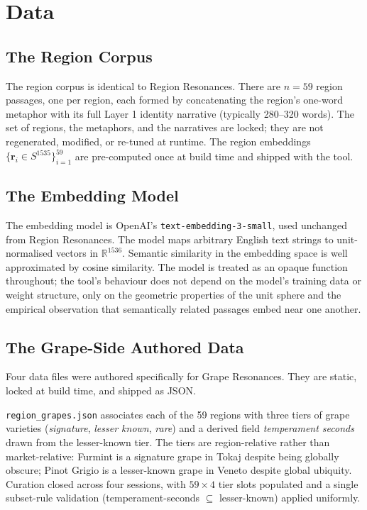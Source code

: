 \documentclass[11pt]{article}
\providecommand{\R}{\mathbb{R}}
\begin{document}
\section{Data}

\subsection{The Region Corpus}
The region corpus is identical to Region Resonances. There are $n = 59$ region passages, one per region, each formed by concatenating the region's one-word metaphor with its full Layer 1 identity narrative (typically 280--320 words). The set of regions, the metaphors, and the narratives are locked; they are not regenerated, modified, or re-tuned at runtime. The region embeddings $\{ \mathbf{r}_i \in S^{1535} \}_{i=1}^{59}$ are pre-computed once at build time and shipped with the tool.

\subsection{The Embedding Model}
The embedding model is OpenAI's \texttt{text-embedding-3-small}, used unchanged from Region Resonances. The model maps arbitrary English text strings to unit-normalised vectors in $\R^{1536}$. Semantic similarity in the embedding space is well approximated by cosine similarity. The model is treated as an opaque function throughout; the tool's behaviour does not depend on the model's training data or weight structure, only on the geometric properties of the unit sphere and the empirical observation that semantically related passages embed near one another.

\subsection{The Grape-Side Authored Data}
Four data files were authored specifically for Grape Resonances. They are static, locked at build time, and shipped as JSON.

\texttt{region\_grapes.json} associates each of the 59 regions with three tiers of grape varieties (\emph{signature}, \emph{lesser known}, \emph{rare}) and a derived field \emph{temperament seconds} drawn from the lesser-known tier. The tiers are region-relative rather than market-relative: Furmint is a signature grape in Tokaj despite being globally obscure; Pinot Grigio is a lesser-known grape in Veneto despite global ubiquity. Curation closed across four sessions, with $59 \times 4$ tier slots populated and a single subset-rule validation (temperament-seconds $\subseteq$ lesser-known) applied uniformly.
\end{document}
